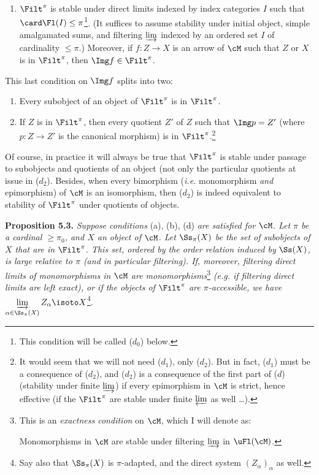 \begin{enumerate}[nosep]
\item[\textit{d})] $\Filt^{\pi}$ is stable under direct limits indexed by index categories $I$ such that $\card \Fl(I) \leq \pi$\footnote[16]{This condition will be called ($d_0$) below.}. (It suffices to assume stability under initial object, simple amalgamated sums, and filtering $\varinjlim$ indexed by an ordered set $I$ of cardinality $\leq \pi$.) Moreover, if $f : Z \longrightarrow X$ is an arrow of $\cM$ such that $Z$ or $X$ is in $\Filt^{\pi}$, then $\Img f \in \Filt^{\pi}$.
\end{enumerate}

This last condition on $\Img f$ splits into two:

\begin{enumerate}[nosep]
\item[$d_1$)] Every subobject of an object of $\Filt^{\pi}$ is in $\Filt^{\pi}$.
\item[$d_2$)] If $Z$ is in $\Filt^{\pi}$, then every quotient $Z'$ of $Z$ such that $\Img p = Z'$ (where $p : Z \longrightarrow Z'$ is the canonical morphism) is in $\Filt^{\pi}$.\footnote[17]{It would seem that we will not need ($d_1$), only ($d_2$). But in fact, ($d_1$) must be a consequence of ($d_2$), and ($d_2$) is a consequence of the first part of ($d$) (stability under finite $\varinjlim$) if every epimorphism in $\cM$ is strict, hence effective (if the $\Filt^{\pi}$ are stable under finite $\varprojlim$ as well \ldots).}
\end{enumerate}


Of course, in practice it will always be true that $\Filt^{\pi}$ is stable under passage to subobjects and quotients of an object (not only the particular quotients at issue in ($d_2$). %
Besides, when every bimorphism (\textit{i.e.} monomorphism \textit{and} epimorphism) of $\cM$ is an isomorphism, then ($d_2$) is indeed equivalent to stability of $\Filt^{\pi}$ under quotients of objects.

\textbf{Proposition 5.3.} \textit{Suppose conditions} (a), (b), (d) \textit{are satisfied for $\cM$. Let $\pi$ be a cardinal $\geq \pi_0$, and $X$ an object of $\cM$. Let} $\Ss_{\pi}(X)$ \textit{be the set of subobjects of $X$ that are in} $\Filt^{\pi}$\textit{. This set, ordered by the order relation induced by} $\Ss(X)$\textit{, is large relative to $\pi$ (and in particular filtering). If, moreover, filtering direct limits of monomorphisms in $\cM$ are monomorphisms}\footnote[18]{This is an \textit{exactness condition} on $\cM$, which I will denote as:\par
\noindent{}\quad Monomorphisms in $\cM$ are stable under filtering $\varinjlim$ in $\uFl(\cM)$.} \textit{(e.g. if filtering direct limits are left exact), or if the objects of} $\Filt^{\pi}$ \textit{are $\pi$-accessible, we have $\varinjlim\limits_{\alpha\in\Ss_{\pi}(X)} Z_{\alpha} \isoto X$}\footnote[19]{Say also that $\Ss_{\pi}(X)$ is $\pi$-adapted, and the direct system $(Z_{\alpha})_{\alpha}$ as well.}.

